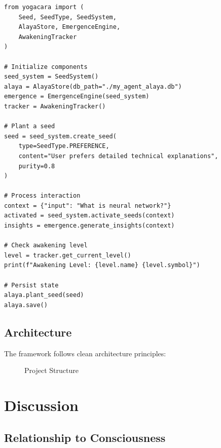 \documentclass[11pt, a4paper]{article}
\begin{document}
\begin{lstlisting}[style=python, caption={Basic Usage Example}, label={lst:basic-usage}]
from yogacara import (
    Seed, SeedType, SeedSystem, 
    AlayaStore, EmergenceEngine, 
    AwakeningTracker
)

# Initialize components
seed_system = SeedSystem()
alaya = AlayaStore(db_path="./my_agent_alaya.db")
emergence = EmergenceEngine(seed_system)
tracker = AwakeningTracker()

# Plant a seed
seed = seed_system.create_seed(
    type=SeedType.PREFERENCE,
    content="User prefers detailed technical explanations",
    purity=0.8
)

# Process interaction
context = {"input": "What is neural network?"}
activated = seed_system.activate_seeds(context)
insights = emergence.generate_insights(context)

# Check awakening level
level = tracker.get_current_level()
print(f"Awakening Level: {level.name} {level.symbol}")

# Persist state
alaya.plant_seed(seed)
alaya.save()
\end{lstlisting}

\subsection{Architecture}

The framework follows clean architecture principles:

\begin{figure}[htbp]
\centering
{}
\caption{Project Structure}
\label{fig:architecture-detail}
\end{figure}

\section{Discussion}

\subsection{Relationship to Consciousness}
\end{document}
